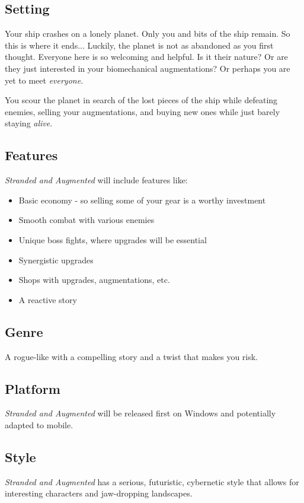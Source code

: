 \documentclass[a4paper,10pt,english]{article}
\begin{document}
\subsection*{Setting}
Your ship crashes on a lonely planet. Only you and bits of the ship remain. So this is where it ends...
Luckily, the planet is not as abandoned as you first thought. Everyone here is so welcoming and helpful.
Is it their nature? Or are they just interested in your biomechanical augmentations? Or perhaps you are yet to meet \emph{everyone}.

You scour the planet in search of the lost pieces of the ship while defeating enemies, selling your augmentations, and buying new ones while just barely staying \emph{alive}.

\subsection*{Features}
\emph{Stranded and Augmented} will include features like:

\begin{itemize}
    \item Basic economy - so selling some of your gear is a worthy investment
    \item Smooth combat with various enemies
    \item Unique boss fights, where upgrades will be essential
    \item Synergistic upgrades
    \item Shops with upgrades, augmentations, etc.
    \item A reactive story
\end{itemize}

\subsection*{Genre}
A rogue-like with a compelling story and a twist that makes you risk.

\subsection*{Platform}
\emph{Stranded and Augmented} will be released first on Windows and potentially adapted to mobile.

\subsection*{Style}
\emph{Stranded and Augmented} has a serious, futuristic, cybernetic style that allows for interesting characters and jaw-dropping landscapes.
\end{document}
